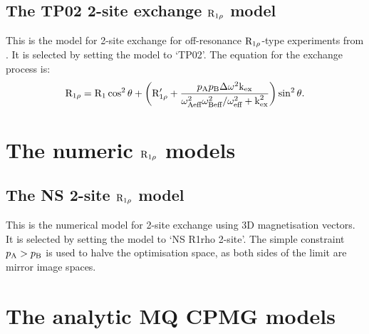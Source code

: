 
\subsection{The TP02 2-site exchange $\mathrm{R}_{1\rho}$ model}
\label{sect: dispersion: TP02 model}

This is the model for 2-site exchange for off-resonance $\mathrm{R}_{1\rho}$-type experiments from \citet{TrottPalmer02}.  It is selected by setting the model to `TP02'.  The equation for the exchange process is:
\begin{equation}
    \mathrm{R}_{1\rho} = \mathrm{R}_1\cos^2\theta + \left( \mathrm{R}_{1\rho}' + \frac{p_\textrm{A}p_\textrm{B}\Delta\omega^2\textrm{k}_\textrm{ex}}{\omega_\textrm{Aeff}^2\omega_\textrm{Beff}^2/\omega_\textrm{eff}^2 + \textrm{k}_\textrm{ex}^2} \right) \sin^2\theta.
\end{equation}




\section{The numeric $\mathrm{R}_{1\rho}$ models}
\label{sect: dispersion: numeric R1rho models}


\subsection{The NS 2-site $\mathrm{R}_{1\rho}$ model}
\label{sect: dispersion: NS R1rho 2-site model}

This is the numerical model for 2-site exchange using 3D magnetisation vectors.
It is selected by setting the model to `NS R1rho 2-site'.
The simple constraint $p_\textrm{A} > p_\textrm{B}$ is used to halve the optimisation space, as both sides of the limit are mirror image spaces.




\section{The analytic MQ CPMG models}
\label{sect: dispersion: analytic MQ CPMG models}


